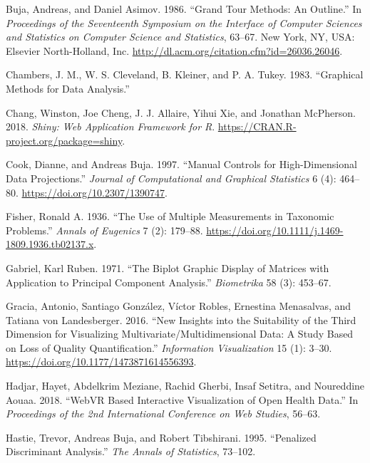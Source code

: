 \documentclass[
  11,
]{article}
\begin{document}
\leavevmode\hypertarget{ref-buja_grand_1986}{}%
Buja, Andreas, and Daniel Asimov. 1986. ``Grand Tour Methods: An Outline.'' In \emph{Proceedings of the Seventeenth Symposium on the Interface of Computer Sciences and Statistics on Computer Science and Statistics}, 63--67. New York, NY, USA: Elsevier North-Holland, Inc. \url{http://dl.acm.org/citation.cfm?id=26036.26046}.

\leavevmode\hypertarget{ref-chambers_graphical_1983}{}%
Chambers, J. M., W. S. Cleveland, B. Kleiner, and P. A. Tukey. 1983. ``Graphical Methods for Data Analysis.''

\leavevmode\hypertarget{ref-chang_shiny:_2018}{}%
Chang, Winston, Joe Cheng, J. J. Allaire, Yihui Xie, and Jonathan McPherson. 2018. \emph{Shiny: Web Application Framework for R}. \url{https://CRAN.R-project.org/package=shiny}.

\leavevmode\hypertarget{ref-cook_manual_1997}{}%
Cook, Dianne, and Andreas Buja. 1997. ``Manual Controls for High-Dimensional Data Projections.'' \emph{Journal of Computational and Graphical Statistics} 6 (4): 464--80. \url{https://doi.org/10.2307/1390747}.

\leavevmode\hypertarget{ref-fisher_use_1936}{}%
Fisher, Ronald A. 1936. ``The Use of Multiple Measurements in Taxonomic Problems.'' \emph{Annals of Eugenics} 7 (2): 179--88. \url{https://doi.org/10.1111/j.1469-1809.1936.tb02137.x}.

\leavevmode\hypertarget{ref-gabriel_biplot_1971}{}%
Gabriel, Karl Ruben. 1971. ``The Biplot Graphic Display of Matrices with Application to Principal Component Analysis.'' \emph{Biometrika} 58 (3): 453--67.

\leavevmode\hypertarget{ref-gracia_new_2016}{}%
Gracia, Antonio, Santiago González, Víctor Robles, Ernestina Menasalvas, and Tatiana von Landesberger. 2016. ``New Insights into the Suitability of the Third Dimension for Visualizing Multivariate/Multidimensional Data: A Study Based on Loss of Quality Quantification.'' \emph{Information Visualization} 15 (1): 3--30. \url{https://doi.org/10.1177/1473871614556393}.

\leavevmode\hypertarget{ref-hadjar_webvr_2018}{}%
Hadjar, Hayet, Abdelkrim Meziane, Rachid Gherbi, Insaf Setitra, and Noureddine Aouaa. 2018. ``WebVR Based Interactive Visualization of Open Health Data.'' In \emph{Proceedings of the 2nd International Conference on Web Studies}, 56--63.

\leavevmode\hypertarget{ref-hastie_penalized_1995}{}%
Hastie, Trevor, Andreas Buja, and Robert Tibshirani. 1995. ``Penalized Discriminant Analysis.'' \emph{The Annals of Statistics}, 73--102.
\end{document}

